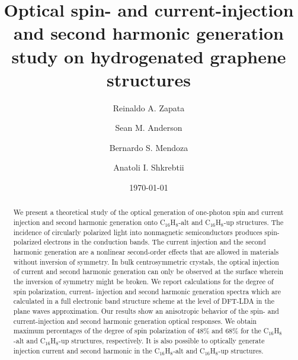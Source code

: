 \documentclass[aps,pra,11pt,tightenlines,showpacs,superscriptaddress,groupedaddress]{revtex4-1}
\newcommand{\altstc}{C$_{16}$H$_{8}$-alt}
\newcommand{\upstc}{C$_{16}$H$_{8}$-up}
\begin{document}
\title{Optical spin- and current-injection and second harmonic generation study on hydrogenated graphene structures}

\author{Reinaldo A. Zapata}
\author{Sean M. Anderson}
\author{Bernardo S. Mendoza}
\author{Anatoli I. Shkrebtii}

\date{\today}



\begin{abstract}

We present a theoretical study of the optical generation of one-photon spin and
current injection and second harmonic generation onto {\altstc} and {\upstc} structures. The incidence of
circularly polarized light into nonmagnetic semiconductors produces spin-
polarized electrons in the conduction bands. The current injection and the
second harmonic generation are a nonlinear second-order effects that are
allowed in materials without inversion of symmetry. In bulk centrosymmetric
crystals, the optical injection of current and second harmonic generation can
only be observed at the surface wherein the inversion of symmetry might be
broken. We report calculations for the degree of spin polarization, current-
injection and second harmonic generation spectra which are calculated in a full
electronic band structure scheme at the level of DFT-LDA in the plane waves
approximation. Our results show an anisotropic behavior of the spin- and
current-injection and second harmonic generation optical responses. We obtain
maximum percentages of the degree of spin polarization of 48\% and 68\% for the
{\altstc} and {\upstc} structures, respectively. It is also possible to
optically generate injection current and second harmonic in the {\altstc} and
{\upstc} structures.

\end{abstract}



\maketitle
\end{document}
